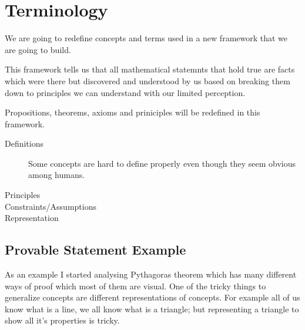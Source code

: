 \documentclass{article}
\begin{document}
\section{Terminology}

We are going to redefine concepts and terms used in a new framework that we are going to build.

This framework tells us that all mathematical statemnts that hold true are facts which were there but discovered and understood by us based on breaking them down to principles we can understand with our limited perception.

Propositions, theorems, axioms and priniciples will be redefined in this framework.

\begin{description}
\item[Definitions]
Some concepts are hard to define properly even though they seem obvious among humans. 
\item[Principles]
 
\item[Constraints/Assumptions]

\item[Representation]


\end{description} 
 


\subsection*{Provable Statement Example}

As an example I started analysing Pythagoras theorem which has many different ways of proof which most of them are visual. One of the tricky things to generalize concepts are different representations of concepts. For example all of us know what is a line, we all know what is a triangle; but representing a triangle to show all it's properties is tricky.






% 

% 

\end{document}
